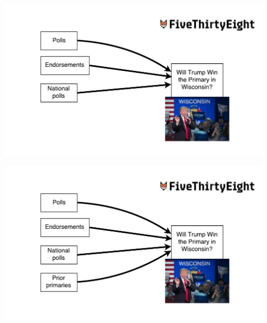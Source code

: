 \documentclass{beamer}
\begin{document}
\begin{frame}[plain]
    \includegraphics[width=\textwidth]{img/538-primary-4.pdf}
\end{frame}

\begin{frame}[plain]
    \includegraphics[width=\textwidth]{img/538-primary-5.pdf}
\end{frame}
\end{document}
